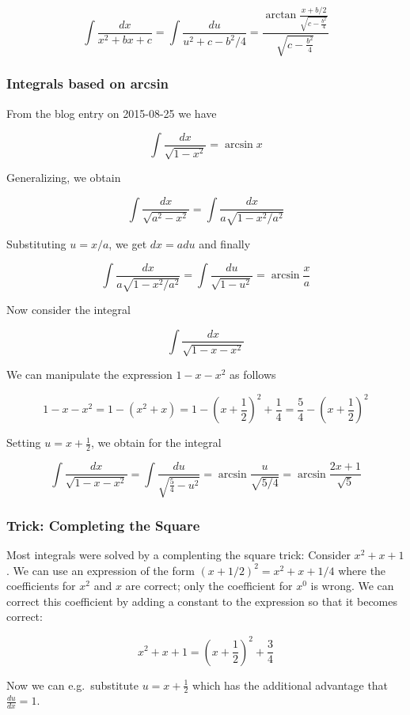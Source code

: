 \[ \int\frac{dx}{x^2+bx+c} = \int \frac{du}{u^2 + c - b^2/4} = \frac{\arctan \frac{x+b/2}{\sqrt{c-\frac{b^2}{4}}}}{\sqrt{c-\frac{b^2}{4}}}\]

\subsubsection{Integrals based on arcsin}

From the blog entry on 2015-08-25 we have

\[\int \frac{dx}{\sqrt{1-x^2}} = \arcsin x\]

Generalizing, we obtain

\[\int \frac{dx}{\sqrt{a^2-x^2}} = \int \frac{dx}{a\sqrt{1-x^2/a^2}} \]

Substituting $u=x/a$, we get $dx = a du$ and finally

\[\int \frac{dx}{a\sqrt{1-x^2/a^2}} = \int \frac{du}{\sqrt{1-u^2}} = \arcsin \frac{x}{a}\]

Now consider the integral

\[ \int \frac{dx}{\sqrt{1-x-x^2}} \]

We can manipulate the expression
$1-x-x^2$ as follows

\[1-x-x^2= 1-(x^2+x) = 1-\left(x+\frac{1}{2}\right)^2+\frac{1}{4} = \frac{5}{4} - \left( x+\frac{1}{2} \right)^2\]

Setting $u=x+\frac{1}{2}$, we obtain for the integral

\[ \int \frac{dx}{\sqrt{1-x-x^2}} = \int \frac{du}{\sqrt{\frac{5}{4} - u^2}} = \arcsin \frac{u}{\sqrt{5/4}} = \arcsin \frac{2x+1}{\sqrt{5}}\]

\subsubsection{Trick: Completing the Square}

Most integrals were solved by a complenting the square trick: Consider $x^2+x+1$. We can use an expression of the form $(x+1/2)^2 = x^2 + x + 1/4$ where the coefficients for $x^2$ and
$x$ are correct; only the coefficient for $x^0$ is wrong. We can correct this coefficient by adding a constant to the expression so that it becomes correct:

\[ x^2+x+1 = \left(x+\frac{1}{2}\right)^2 + \frac{3}{4} \]

Now we can e.g.~substitute $u=x+\frac{1}{2}$ which has the
additional advantage that $\frac{du}{dx} = 1$.
